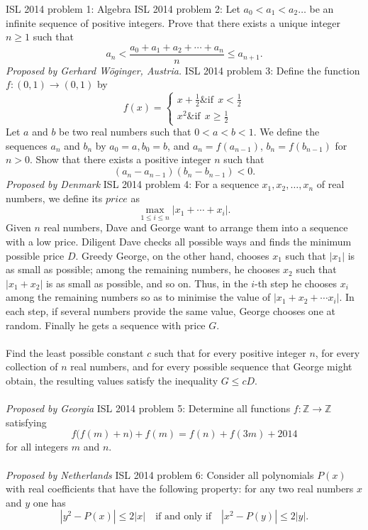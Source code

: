 ISL 2014 problem 1:  Algebra 
ISL 2014 problem 2:  Let $a_0 < a_1 < a_2 \ldots$ be an infinite sequence of positive integers. Prove that there exists a unique integer $n\geq 1$ such that
\[ a_n < \frac{a_0+a_1+a_2+\cdots+a_n}{n} \leq a_{n+1}. \]
\textit{Proposed by Gerhard Wöginger, Austria.} 
ISL 2014 problem 3:  Define the function $f:(0,1)\to (0,1)$ by
\[
\displaystyle f(x) = \left\{
\begin{array}{lr} x+\frac 12 \& \text{if}\ \  x < \frac 12\\ x^2 \& \text{if}\ \  x \ge \frac 12 \end{array}
\right.
\]
Let $a$ and $b$ be two real numbers such that $0 < a < b < 1$. We define the sequences $a_n$ and $b_n$ by $a_0 = a, b_0 = b$, and $a_n = f( a_{n -1})$, $b_n = f (b_{n -1} )$ for $n > 0$. Show that there exists a positive integer $n$ such that
\[ (a_n - a_{n-1})(b_n-b_{n-1})<0. \]
\textit{Proposed by Denmark} 
ISL 2014 problem 4:  For a sequence $x_1,x_2,\ldots,x_n$ of real numbers, we define its $\textit{price}$ as
\[ \max_{1\le i\le n}|x_1+\cdots +x_i|. \]
Given $n$ real numbers, Dave and George want to arrange them into a sequence with a low price. Diligent Dave checks all possible ways and finds the minimum possible price $D$. Greedy George, on the other hand, chooses $x_1$ such that $|x_1 |$ is as small as possible; among the remaining numbers, he chooses $x_2$ such that $|x_1 + x_2 |$ is as small as possible, and so on. Thus, in the $i$-th step he chooses $x_i$ among the remaining numbers so as to minimise the value of $|x_1 + x_2 + \cdots  x_i |$. In each step, if several numbers provide the same value, George chooses one at random. Finally he gets a sequence with price $G$. \\\\
Find the least possible constant $c$ such that for every positive integer $n$, for every collection of $n$ real numbers, and for every possible sequence that George might obtain, the resulting values satisfy the inequality $G\le cD$. \\\\
\textit{Proposed by Georgia} 
ISL 2014 problem 5:  Determine all functions $f: \mathbb{Z}\to\mathbb{Z}$ satisfying
\[ f\big(f(m)+n\big)+f(m)=f(n)+f(3m)+2014 \]
for all integers $m$ and $n$. \\\\
\textit{Proposed by Netherlands} 
ISL 2014 problem 6:  Consider all polynomials $P(x)$ with real coefficients that have the following property: for any two real numbers $x$ and $y$ one has
\[ |y^2-P(x)|\le 2|x|\quad\text{if and only if}\quad |x^2-P(y)|\le 2|y|. \]
